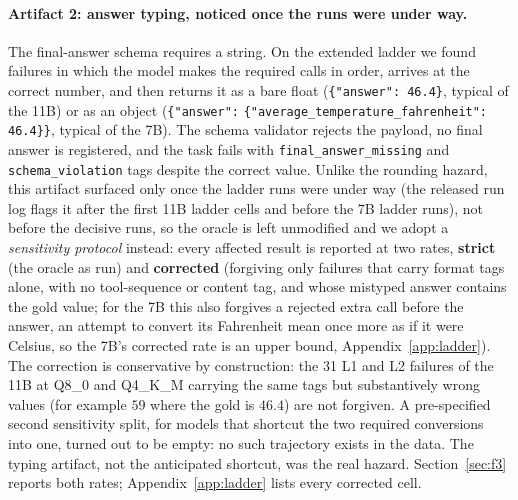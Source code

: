 \documentclass[11pt]{article}
\begin{document}
\begin{sloppypar}\paragraph{Artifact 2: answer typing, noticed once the runs were under way.} The final-answer schema requires a string. On the extended ladder we found failures in which the model makes the required calls in order, arrives at the correct number, and then returns it as a bare float (\verb|{"answer": 46.4}|, typical of the 11B) or as an object (\verb|{"answer":| \verb|{"average_temperature_fahrenheit": 46.4}}|, typical of the 7B). The schema validator rejects the payload, no final answer is registered, and the task fails with \texttt{final\_answer\_missing} and \texttt{schema\_violation} tags despite the correct value. Unlike the rounding hazard, this artifact surfaced only once the ladder runs were under way (the released run log flags it after the first 11B ladder cells and before the 7B ladder runs), not before the decisive runs, so the oracle is left unmodified and we adopt a \emph{sensitivity protocol} instead: every affected result is reported at two rates, \textbf{strict} (the oracle as run) and \textbf{corrected} (forgiving only failures that carry format tags alone, with no tool-sequence or content tag, and whose mistyped answer contains the gold value; for the 7B this also forgives a rejected extra call before the answer, an attempt to convert its Fahrenheit mean once more as if it were Celsius, so the 7B's corrected rate is an upper bound, Appendix~\ref{app:ladder}). The correction is conservative by construction: the 31 L1 and L2 failures of the 11B at Q8\_0 and Q4\_K\_M carrying the same tags but substantively wrong values (for example $59$ where the gold is $46.4$) are not forgiven. A pre-specified second sensitivity split, for models that shortcut the two required conversions into one, turned out to be empty: no such trajectory exists in the data. The typing artifact, not the anticipated shortcut, was the real hazard. Section~\ref{sec:f3} reports both rates; Appendix~\ref{app:ladder} lists every corrected cell.\end{sloppypar}
\end{document}
